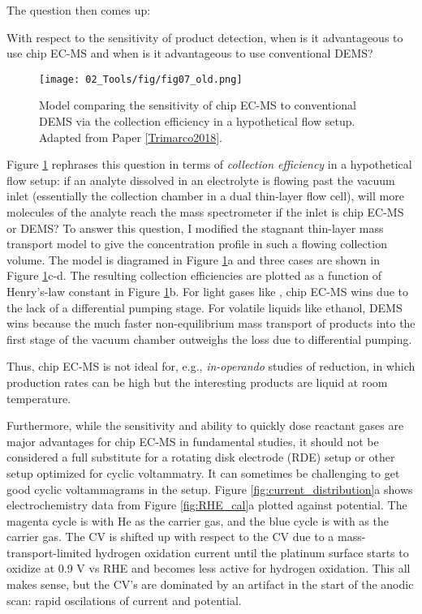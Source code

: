 The question then comes up:
\begin{question}
	With respect to the sensitivity of product detection, when is it advantageous to use chip EC-MS and when is it advantageous to use conventional DEMS?
\end{question}
\begin{figure}[h!]
	\texttt{[image: 02\_Tools/fig/fig07\_old.png]}
	\caption{Model comparing the sensitivity of chip EC-MS to conventional DEMS via the collection efficiency in a hypothetical flow setup. Adapted from Paper \ref{Trimarco2018}.}
	\label{fig:sensitivity}
\end{figure}
Figure \ref{fig:sensitivity} rephrases this question in terms of \textit{collection efficiency} in a hypothetical flow setup: if an analyte dissolved in an electrolyte is flowing past the vacuum inlet (essentially the collection chamber in a dual thin-layer flow cell\cite{Jusys1999, Clark2015}), will more molecules of the analyte reach the mass spectrometer if the inlet is chip EC-MS or DEMS? To answer this question, I modified the stagnant thin-layer mass transport model to give the concentration profile in such a flowing collection volume\cite{Scott2016_MSc}. The model is diagramed in Figure \ref{fig:sensitivity}a and three cases are shown in Figure \ref{fig:sensitivity}c-d. The resulting collection efficiencies are plotted as a function of Henry's-law constant in Figure \ref{fig:sensitivity}b. For light gases like , chip EC-MS wins due to the lack of a differential pumping stage. For volatile liquids like ethanol, DEMS wins because the much faster non-equilibrium mass transport of products into the first stage of the vacuum chamber outweighs the loss due to differential pumping. 

Thus, chip EC-MS is not ideal for, e.g., \textit{in-operando} studies of  reduction, in which production rates can be high but the interesting products are liquid at room temperature.

\vspace{5mm}
Furthermore, while the sensitivity and ability to quickly dose reactant gases are major advantages for chip EC-MS in fundamental studies, it should not be considered a full substitute for a rotating disk electrode (RDE) setup or other setup optimized for cyclic voltammatry. It can sometimes be challenging to get good cyclic voltammagrams in the setup. Figure \ref{fig:current_distribution}a shows electrochemistry data from Figure \ref{fig:RHE_cal}a plotted against potential. The magenta cycle is with He as the carrier gas, and the blue cycle is with  as the carrier gas. The  CV is shifted up with respect to the  CV due to a mass-transport-limited hydrogen oxidation current until the platinum surface starts to oxidize at 0.9 V vs RHE and becomes less active for hydrogen oxidation. This all makes sense, but the CV's are dominated by an artifact in the start of the anodic scan: rapid oscilations of current and potential. 

